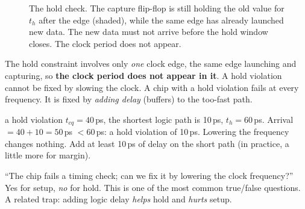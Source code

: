 \begin{figure}[h]
\centering
{}
\caption{The hold check. The capture flip-flop is still holding the old value for $t_h$ after the edge (shaded), while the same edge has already launched new data. The new data must not arrive before the hold window closes. The clock period does not appear.}
\label{fig:hold}
\end{figure}

\begin{bigidea}
The hold constraint involves only \emph{one} clock edge, the same edge launching and capturing, so \textbf{the clock period does not appear in it}. A hold violation cannot be fixed by slowing the clock. A chip with a hold violation fails at every frequency. It is fixed by \emph{adding delay} (buffers) to the too-fast path.
\end{bigidea}

\begin{worked}{a hold violation}
$t_{cq} = 40$\,ps, the shortest logic path is 10\,ps, $t_h = 60$\,ps.
Arrival $= 40 + 10 = 50$\,ps $< 60$\,ps: a hold violation of 10\,ps. Lowering the frequency changes nothing. Add at least 10\,ps of delay on the short path (in practice, a little more for margin).
\end{worked}

\begin{trap}
``The chip fails a timing check; can we fix it by lowering the clock frequency?'' Yes for setup, \emph{no} for hold. This is one of the most common true/false questions. A related trap: adding logic delay \emph{helps} hold and \emph{hurts} setup.
\end{trap}

